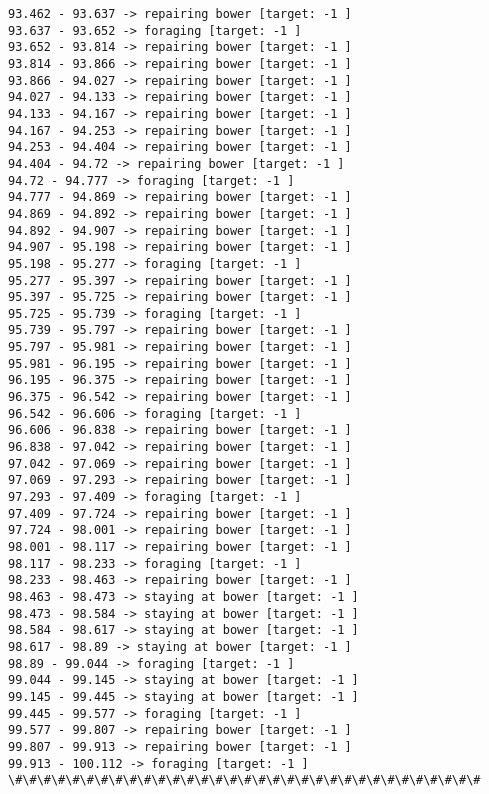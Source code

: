 \documentclass[11pt]{article}
\begin{document}
\begin{Verbatim}[commandchars=\\\{\}]
93.462 - 93.637 -> repairing bower [target: -1 ]
93.637 - 93.652 -> foraging [target: -1 ]
93.652 - 93.814 -> repairing bower [target: -1 ]
93.814 - 93.866 -> repairing bower [target: -1 ]
93.866 - 94.027 -> repairing bower [target: -1 ]
94.027 - 94.133 -> repairing bower [target: -1 ]
94.133 - 94.167 -> repairing bower [target: -1 ]
94.167 - 94.253 -> repairing bower [target: -1 ]
94.253 - 94.404 -> repairing bower [target: -1 ]
94.404 - 94.72 -> repairing bower [target: -1 ]
94.72 - 94.777 -> foraging [target: -1 ]
94.777 - 94.869 -> repairing bower [target: -1 ]
94.869 - 94.892 -> repairing bower [target: -1 ]
94.892 - 94.907 -> repairing bower [target: -1 ]
94.907 - 95.198 -> repairing bower [target: -1 ]
95.198 - 95.277 -> foraging [target: -1 ]
95.277 - 95.397 -> repairing bower [target: -1 ]
95.397 - 95.725 -> repairing bower [target: -1 ]
95.725 - 95.739 -> foraging [target: -1 ]
95.739 - 95.797 -> repairing bower [target: -1 ]
95.797 - 95.981 -> repairing bower [target: -1 ]
95.981 - 96.195 -> repairing bower [target: -1 ]
96.195 - 96.375 -> repairing bower [target: -1 ]
96.375 - 96.542 -> repairing bower [target: -1 ]
96.542 - 96.606 -> foraging [target: -1 ]
96.606 - 96.838 -> repairing bower [target: -1 ]
96.838 - 97.042 -> repairing bower [target: -1 ]
97.042 - 97.069 -> repairing bower [target: -1 ]
97.069 - 97.293 -> repairing bower [target: -1 ]
97.293 - 97.409 -> foraging [target: -1 ]
97.409 - 97.724 -> repairing bower [target: -1 ]
97.724 - 98.001 -> repairing bower [target: -1 ]
98.001 - 98.117 -> repairing bower [target: -1 ]
98.117 - 98.233 -> foraging [target: -1 ]
98.233 - 98.463 -> repairing bower [target: -1 ]
98.463 - 98.473 -> staying at bower [target: -1 ]
98.473 - 98.584 -> staying at bower [target: -1 ]
98.584 - 98.617 -> staying at bower [target: -1 ]
98.617 - 98.89 -> staying at bower [target: -1 ]
98.89 - 99.044 -> foraging [target: -1 ]
99.044 - 99.145 -> staying at bower [target: -1 ]
99.145 - 99.445 -> staying at bower [target: -1 ]
99.445 - 99.577 -> foraging [target: -1 ]
99.577 - 99.807 -> repairing bower [target: -1 ]
99.807 - 99.913 -> repairing bower [target: -1 ]
99.913 - 100.112 -> foraging [target: -1 ]
\#\#\#\#\#\#\#\#\#\#\#\#\#\#\#\#\#\#\#\#\#\#\#\#\#\#\#\#\#\#\#\#\#



\end{Verbatim}
\end{document}
